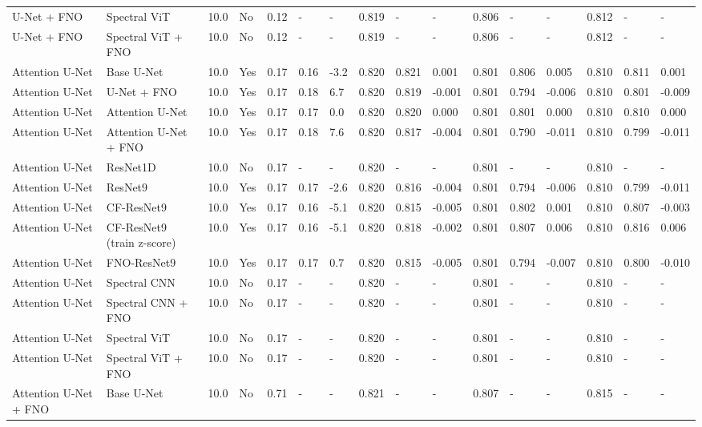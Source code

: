 \begin{longtable}{llllllllllllllll}
U-Net + FNO & Spectral ViT & 10.0 & No & 0.12 & - & - & 0.819 & - & - & 0.806 & - & - & 0.812 & - & - \\
U-Net + FNO & Spectral ViT + FNO & 10.0 & No & 0.12 & - & - & 0.819 & - & - & 0.806 & - & - & 0.812 & - & - \\
Attention U-Net & Base U-Net & 10.0 & Yes & 0.17 & 0.16 & -3.2 & 0.820 & 0.821 & 0.001 & 0.801 & 0.806 & 0.005 & 0.810 & 0.811 & 0.001 \\
Attention U-Net & U-Net + FNO & 10.0 & Yes & 0.17 & 0.18 & 6.7 & 0.820 & 0.819 & -0.001 & 0.801 & 0.794 & -0.006 & 0.810 & 0.801 & -0.009 \\
Attention U-Net & Attention U-Net & 10.0 & Yes & 0.17 & 0.17 & 0.0 & 0.820 & 0.820 & 0.000 & 0.801 & 0.801 & 0.000 & 0.810 & 0.810 & 0.000 \\
Attention U-Net & Attention U-Net + FNO & 10.0 & Yes & 0.17 & 0.18 & 7.6 & 0.820 & 0.817 & -0.004 & 0.801 & 0.790 & -0.011 & 0.810 & 0.799 & -0.011 \\
Attention U-Net & ResNet1D & 10.0 & No & 0.17 & - & - & 0.820 & - & - & 0.801 & - & - & 0.810 & - & - \\
Attention U-Net & ResNet9 & 10.0 & Yes & 0.17 & 0.17 & -2.6 & 0.820 & 0.816 & -0.004 & 0.801 & 0.794 & -0.006 & 0.810 & 0.799 & -0.011 \\
Attention U-Net & CF-ResNet9 & 10.0 & Yes & 0.17 & 0.16 & -5.1 & 0.820 & 0.815 & -0.005 & 0.801 & 0.802 & 0.001 & 0.810 & 0.807 & -0.003 \\
Attention U-Net & CF-ResNet9 (train z-score) & 10.0 & Yes & 0.17 & 0.16 & -5.1 & 0.820 & 0.818 & -0.002 & 0.801 & 0.807 & 0.006 & 0.810 & 0.816 & 0.006 \\
Attention U-Net & FNO-ResNet9 & 10.0 & Yes & 0.17 & 0.17 & 0.7 & 0.820 & 0.815 & -0.005 & 0.801 & 0.794 & -0.007 & 0.810 & 0.800 & -0.010 \\
Attention U-Net & Spectral CNN & 10.0 & No & 0.17 & - & - & 0.820 & - & - & 0.801 & - & - & 0.810 & - & - \\
Attention U-Net & Spectral CNN + FNO & 10.0 & No & 0.17 & - & - & 0.820 & - & - & 0.801 & - & - & 0.810 & - & - \\
Attention U-Net & Spectral ViT & 10.0 & No & 0.17 & - & - & 0.820 & - & - & 0.801 & - & - & 0.810 & - & - \\
Attention U-Net & Spectral ViT + FNO & 10.0 & No & 0.17 & - & - & 0.820 & - & - & 0.801 & - & - & 0.810 & - & - \\
Attention U-Net + FNO & Base U-Net & 10.0 & No & 0.71 & - & - & 0.821 & - & - & 0.807 & - & - & 0.815 & - & - \\

\end{longtable}
